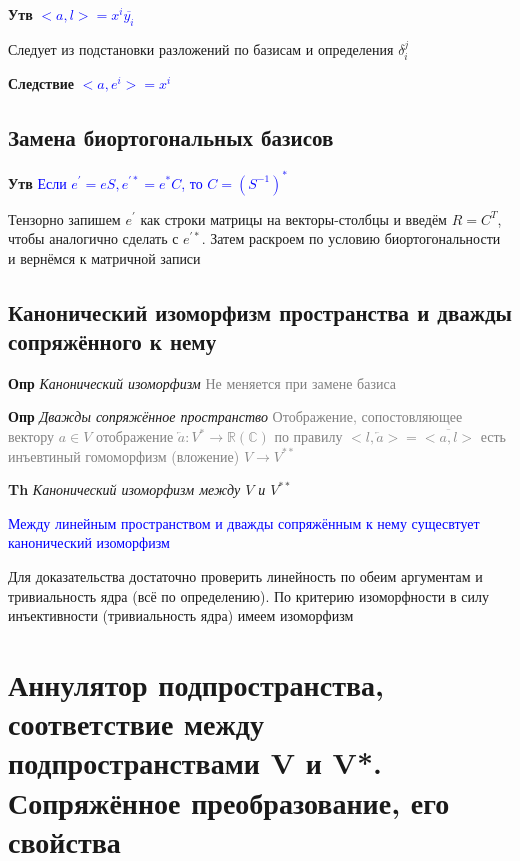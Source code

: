 \documentclass[a4paper, 14pt]{article}
\begin{document}
    \textbf{Утв} \textcolor{blue}{$<a, l> = x^i \overline{y_i}$}
    
    Следует из подстановки разложений по базисам и определения $\delta_i^j$
    
    \textbf{Следствие} \textcolor{blue}{$<a, e^i> = x^i$}
    
    \subsection{Замена биортогональных базисов}
    
    \textbf{Утв} \textcolor{blue}{Если $e^{'} = eS, e^{'*} = e^* C$, то $C = (S^{-1})^*$}
    
    Тензорно запишем $e^{'}$ как строки матрицы на векторы-столбцы и введём $R = C^T$, чтобы аналогично сделать с $e^{'*}$.
    Затем раскроем по условию биортогональности и вернёмся к матричной записи
    
    \subsection{Канонический изоморфизм пространства и дважды сопряжённого к нему}
    
    \textbf{Опр} \textit{Канонический изоморфизм} \textcolor{gray}{Не меняется при замене базиса}
    
    \textbf{Опр} \textit{Дважды сопряжённое пространство} \textcolor{gray}{Отображение, сопостовляющее
    вектору $a \in V$ отображение $\overleftarrow{a}: V^* \rightarrow \mathbb{R} (\mathbb{C})$ по
    правилу $<l, \overleftarrow{a}> = \overline{<a, l>}$ есть инъевтиный гомоморфизм (вложение) $V \rightarrow V^{**}$}
    
    \textbf{Th} \textit{Канонический изоморфизм между $V$ и $V^{**}$}
    
    \textcolor{blue}{Между линейным пространством и дважды сопряжённым к нему сущесвтует канонический изоморфизм}
    
    Для доказательства достаточно проверить линейность по обеим аргументам и тривиальность ядра (всё по
    определению).
    По критерию изоморфности в силу инъективности (тривиальность ядра) имеем изоморфизм
    
    \section{Аннулятор подпространства, соответствие между подпространствами V и V*.
    Сопряжённое преобразование, его свойства}
    
\end{document}
